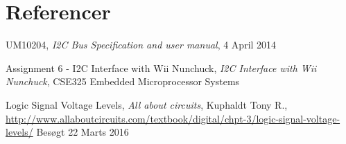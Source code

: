 \chapter{Referencer}

\begin{thebibliography}{9}
	
	UM10204,
	\textit{I2C Bus Specification and user manual}, 4 April 2014
	
	Assignment 6 - I2C Interface with Wii Nunchuck,
	\textit{I2C Interface with Wii Nunchuck}, CSE325 Embedded Microprocessor Systems
	
	
	Logic Signal Voltage Levels,
	\textit{All about circuits},
	Kuphaldt Tony R.,\newline
	\url{http://www.allaboutcircuits.com/textbook/digital/chpt-3/logic-signal-voltage-levels/} 
	Besøgt 22 Marts 2016
	
	
\end{thebibliography}